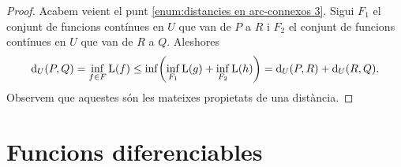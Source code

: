 \documentclass[../Apunts.tex]{subfiles}
\begin{document}
\begin{proposition}
\begin{proof}
			Acabem veient el punt \eqref{enum:distancies en arc-connexos 3}. Sigui \(F_{1}\) el conjunt de funcions contínues en \(U\) que van de \(P\) a \(R\) i \(F_{2}\) el conjunt de funcions contínues en \(U\) que van de \(R\) a \(Q\). Aleshores
			\begin{displaymath}
			\Dist_{U}(P,Q)=\inf_{f\in F}\Long(f)\leq\inf\left(\inf_{F_{1}}\Long(g)+\inf_{F_{2}}\Long(h)\right)=\Dist_{U}(P,R)+\Dist_{U}(R,Q).
			\end{displaymath}%
			Observem que aquestes són les mateixes propietats de una distància.
		\end{proof}
	\end{proposition}
	\section{Funcions diferenciables}
\end{document}
